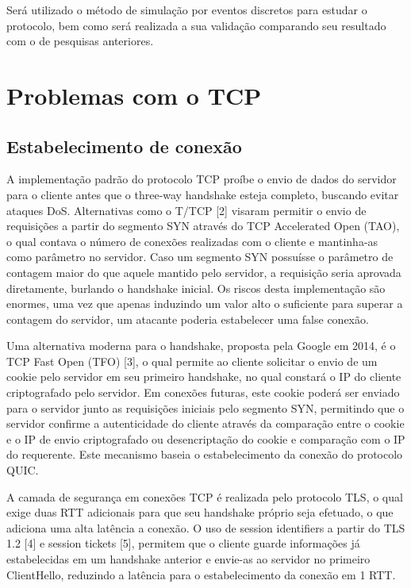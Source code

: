 \documentclass{article}
\begin{document}
Será utilizado o método de simulação por eventos discretos para estudar o protocolo, bem como será realizada a sua
validação comparando seu resultado com o de pesquisas anteriores.

\section{Problemas com o TCP}

\subsection{Estabelecimento de conexão}
A implementação padrão do protocolo TCP proíbe o envio de dados do servidor para o cliente antes que o three-way
handshake esteja completo, buscando evitar ataques DoS. Alternativas como o T/TCP [2] visaram permitir o envio de
requisições a partir do segmento SYN através do TCP Accelerated Open (TAO), o qual contava o número de conexões
realizadas com o cliente e mantinha-as como parâmetro no servidor. Caso um segmento SYN possuísse o parâmetro de
contagem maior do que aquele mantido pelo servidor, a requisição seria aprovada diretamente, burlando o handshake
inicial. Os riscos desta implementação são enormes, uma vez que apenas induzindo um valor alto o suficiente para superar
a contagem do servidor, um atacante poderia estabelecer uma false conexão.

Uma alternativa moderna para o handshake, proposta pela Google em 2014, é o TCP Fast Open (TFO) [3], o qual permite ao
cliente solicitar o envio de um cookie pelo servidor em seu primeiro handshake, no qual constará o IP do cliente
criptografado pelo servidor. Em conexões futuras, este cookie poderá ser enviado para o servidor junto as requisições
iniciais pelo segmento SYN, permitindo que o servidor confirme a autenticidade do cliente através da comparação entre o
cookie e o IP de envio criptografado ou desencriptação do cookie e comparação com o IP do requerente. Este mecanismo
baseia o estabelecimento da conexão do protocolo QUIC. 

A camada de segurança em conexões TCP é realizada pelo protocolo TLS, o qual exige duas RTT adicionais para que seu
handshake próprio seja efetuado, o que adiciona uma alta latência a conexão. O uso de session identifiers a partir do
TLS 1.2 [4] e session tickets [5], permitem que o cliente guarde informações já estabelecidas em um handshake anterior e
envie-as ao servidor no primeiro ClientHello, reduzindo a latência para o estabelecimento da conexão em 1 RTT.
\end{document}
